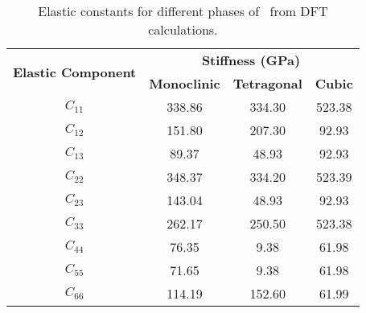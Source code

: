 \begin{table}[htp] %
\onehalfspacing
\centering
\caption{Elastic constants for different phases of \zirconia\ from DFT calculations.}
\label{stiffness_tensor}
\begin{tabular}{cccc}
\hline
\multirow{2}{*}{\textbf{Elastic Component}} & \multicolumn{3}{c}{\textbf{Stiffness (GPa)}}               \\ \cline{2-4} 
                                            & \textbf{Monoclinic} & \textbf{Tetragonal} & \textbf{Cubic} \\ \hline
$C_{11}$                                         & 338.86        & 334.30               & 523.38    \\
$C_{12}$                                         & 151.80        & 207.30               & 92.93     \\
$C_{13}$                                         & 89.37         & 48.93               & 92.93     \\
$C_{22}$                                         & 348.37        & 334.20               & 523.39    \\
$C_{23}$                                         & 143.04        & 48.93               & 92.93    \\
$C_{33}$                                         & 262.17        & 250.50               & 523.38   \\
$C_{44}$                                         & 76.35         & 9.38                & 61.98    \\
$C_{55}$                                         & 71.65         & 9.38                & 61.98   \\
$C_{66}$                                         & 114.19        & 152.60               & 61.99     \\ \hline
\end{tabular}
\end{table}

